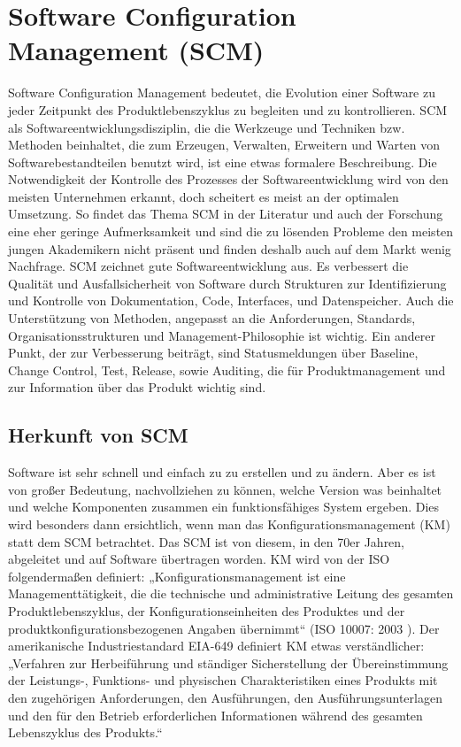 \chapter{Software Configuration Management (\acs{SCM})}
Software Configuration Management bedeutet, die Evolution einer Software zu jeder Zeitpunkt des Produktlebenszyklus zu begleiten und zu kontrollieren. \acs{SCM} als Softwareentwicklungsdisziplin, die die Werkzeuge und Techniken bzw. Methoden beinhaltet, die zum Erzeugen, Verwalten, Erweitern und Warten von Softwarebestandteilen benutzt wird, ist eine etwas formalere Beschreibung. Die Notwendigkeit der Kontrolle des Prozesses der Softwareentwicklung wird von den meisten Unternehmen erkannt, doch scheitert es meist an der optimalen Umsetzung. So findet das Thema SCM in der Literatur und auch der Forschung eine eher geringe Aufmerksamkeit und sind die zu lösenden Probleme den meisten jungen Akademikern nicht präsent und finden deshalb auch auf dem Markt wenig Nachfrage. SCM zeichnet gute Softwareentwicklung aus.  Es verbessert die Qualität und Ausfallsicherheit von Software durch Strukturen zur Identifizierung und Kontrolle von Dokumentation, Code, Interfaces, und Datenspeicher. Auch die Unterstützung von Methoden, angepasst an die Anforderungen, Standards, Organisationsstrukturen und Management-Philosophie ist wichtig. Ein anderer Punkt, der zur Verbesserung beiträgt, sind Statusmeldungen über Baseline, Change Control, Test, Release, sowie Auditing, die für Produktmanagement und zur Information über das Produkt wichtig sind. 

\section{Herkunft von SCM}
Software ist sehr schnell und einfach zu zu erstellen und zu ändern. Aber es ist von großer Bedeutung, nachvollziehen zu können, welche Version was beinhaltet und welche Komponenten zusammen ein funktionsfähiges System ergeben. Dies wird besonders dann ersichtlich, wenn man das Konfigurationsmanagement (KM) statt dem SCM betrachtet. Das SCM ist von diesem, in den 70er Jahren, abgeleitet und auf Software übertragen worden. KM wird von der ISO folgendermaßen definiert: „Konfigurationsmanagement ist eine Managementtätigkeit, die die technische und administrative Leitung des gesamten Produktlebenszyklus, der Konfigurationseinheiten des Produktes und der produktkonfigurationsbezogenen Angaben übernimmt“ (\acs{ISO} 10007: 2003 \cite{km-hamburg}). Der amerikanische Industriestandard EIA-649 definiert KM etwas verständlicher: „Verfahren zur Herbeiführung und ständiger Sicherstellung der Übereinstimmung der Leistungs-, Funktions- und physischen Charakteristiken eines Produkts mit den zugehörigen Anforderungen, den Ausführungen, den Ausführungsunterlagen und den für den Betrieb erforderlichen Informationen während des gesamten Lebenszyklus des Produkts.“ \cite{gbt-km}

